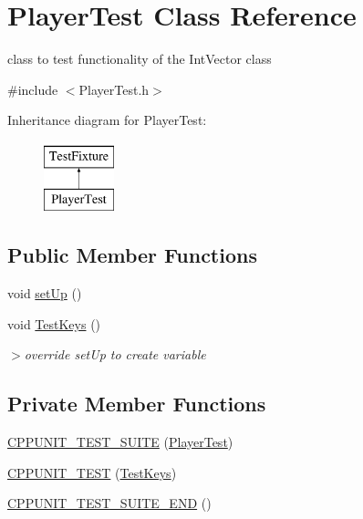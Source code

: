 \hypertarget{classPlayerTest}{\section{Player\-Test Class Reference}
\label{classPlayerTest}
}


class to test functionality of the Int\-Vector class  




{\ttfamily \#include $<$Player\-Test.\-h$>$}

Inheritance diagram for Player\-Test\-:\begin{figure}[H]
\begin{center}
\leavevmode
\includegraphics[height=2.000000cm]{classPlayerTest}
\end{center}
\end{figure}
\subsection*{Public Member Functions}
\begin{DoxyCompactItemize}
\item 
void \hyperlink{classPlayerTest_a5fc4e3940fe2442cc760b12985ceef3b}{set\-Up} ()
\item 
void \hyperlink{classPlayerTest_af7b63b181271a7fa168cf73b0d85d346}{Test\-Keys} ()
\begin{DoxyCompactList}\small\item\em $>$override {\ttfamily set\-Up} to create variable \end{DoxyCompactList}\end{DoxyCompactItemize}
\subsection*{Private Member Functions}
\begin{DoxyCompactItemize}
\item 
\hyperlink{classPlayerTest_a02dcdc23e12801f583826e13aa38609d}{C\-P\-P\-U\-N\-I\-T\-\_\-\-T\-E\-S\-T\-\_\-\-S\-U\-I\-T\-E} (\hyperlink{classPlayerTest}{Player\-Test})
\item 
\hyperlink{classPlayerTest_a0159eeaf95cc6bf3ddc352efd6049530}{C\-P\-P\-U\-N\-I\-T\-\_\-\-T\-E\-S\-T} (\hyperlink{classPlayerTest_af7b63b181271a7fa168cf73b0d85d346}{Test\-Keys})
\item 
\hyperlink{classPlayerTest_ae5022bed52c0af937d91f24e614d8ea6}{C\-P\-P\-U\-N\-I\-T\-\_\-\-T\-E\-S\-T\-\_\-\-S\-U\-I\-T\-E\-\_\-\-E\-N\-D} ()
\end{DoxyCompactItemize}
